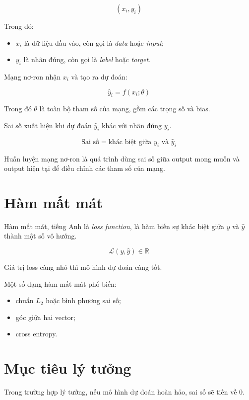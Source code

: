 \documentclass[12pt,a4paper]{report}
\begin{document}
\[
    (x_i, y_i)
\]

Trong đó:

\begin{itemize}
    \item $x_i$ là dữ liệu đầu vào, còn gọi là \textit{data} hoặc \textit{input};
    \item $y_i$ là nhãn đúng, còn gọi là \textit{label} hoặc \textit{target}.
\end{itemize}

Mạng nơ-ron nhận $x_i$ và tạo ra dự đoán:

\[
    \hat{y}_i = f(x_i;\theta)
\]

Trong đó $\theta$ là toàn bộ tham số của mạng, gồm các trọng số và bias.

Sai số xuất hiện khi dự đoán $\hat{y}_i$ khác với nhãn đúng $y_i$.

\[
    \text{Sai số} = \text{khác biệt giữa } y_i \text{ và } \hat{y}_i
\]

\begin{ghinho}
Huấn luyện mạng nơ-ron là quá trình dùng sai số giữa output mong muốn và output hiện tại để điều chỉnh các tham số của mạng.
\end{ghinho}

\section{Hàm mất mát}

Hàm mất mát, tiếng Anh là \textit{loss function}, là hàm biến sự khác biệt giữa $y$ và $\hat{y}$ thành một số vô hướng.

\[
    \mathcal{L}(y,\hat{y}) \in \mathbb{R}
\]

Giá trị loss càng nhỏ thì mô hình dự đoán càng tốt.

Một số dạng hàm mất mát phổ biến:

\begin{itemize}
    \item chuẩn $L_2$ hoặc bình phương sai số;
    \item góc giữa hai vector;
    \item cross entropy.
\end{itemize}

\section{Mục tiêu lý tưởng}

Trong trường hợp lý tưởng, nếu mô hình dự đoán hoàn hảo, sai số sẽ tiến về 0.
\end{document}
